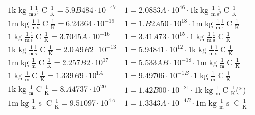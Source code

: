 \begin{center}
\begin{longtable}{l l}
{\color{gray}$1 \bm{\mathrm{ k}}\operatorname{kg}\frac1{\operatorname{m}}\frac1{\operatorname{s}^2}{\operatorname{C}}\frac1{\operatorname{K}} = 5.9B484\cdot10^{-47} $}   & {\color{gray}$ 1 = 2.0853A\cdot10^{46} \cdot 1 \bm{\mathrm{ k}}\operatorname{kg}\frac1{\operatorname{m}}\frac1{\operatorname{s}^2}{\operatorname{C}}\frac1{\operatorname{K}}$}  \\
{\color{gray}$1 \bm{\mathrm{ m}}\operatorname{kg}\frac1{\operatorname{m}}\frac1{\operatorname{s}}{\operatorname{C}}\frac1{\operatorname{K}} = 6.24364\cdot10^{-19} $}   & {\color{gray}$ 1 = 1.B2A50\cdot10^{18} \cdot 1 \bm{\mathrm{ m}}\operatorname{kg}\frac1{\operatorname{m}}\frac1{\operatorname{s}}{\operatorname{C}}\frac1{\operatorname{K}}$}  \\
{\color{black}$1 \bm{\mathrm{ }}\operatorname{kg}\frac1{\operatorname{m}}\frac1{\operatorname{s}}{\operatorname{C}}\frac1{\operatorname{K}} = 3.7045A\cdot10^{-16} $}   & {\color{black}$ 1 = 3.41A73\cdot10^{15} \cdot 1 \bm{\mathrm{ }}\operatorname{kg}\frac1{\operatorname{m}}\frac1{\operatorname{s}}{\operatorname{C}}\frac1{\operatorname{K}}$}  \\
{\color{gray}$1 \bm{\mathrm{ k}}\operatorname{kg}\frac1{\operatorname{m}}\frac1{\operatorname{s}}{\operatorname{C}}\frac1{\operatorname{K}} = 2.0A9B2\cdot10^{-13} $}   & {\color{gray}$ 1 = 5.94841\cdot10^{12} \cdot 1 \bm{\mathrm{ k}}\operatorname{kg}\frac1{\operatorname{m}}\frac1{\operatorname{s}}{\operatorname{C}}\frac1{\operatorname{K}}$}  \\
{\color{gray}$1 \bm{\mathrm{ m}}\operatorname{kg}\frac1{\operatorname{m}}{}{\operatorname{C}}\frac1{\operatorname{K}} = 2.257B2\cdot10^{17} $}   & {\color{gray}$ 1 = 5.533AB\cdot10^{-18} \cdot 1 \bm{\mathrm{ m}}\operatorname{kg}\frac1{\operatorname{m}}{}{\operatorname{C}}\frac1{\operatorname{K}}$}  \\
{\color{black}$1 \bm{\mathrm{ }}\operatorname{kg}\frac1{\operatorname{m}}{}{\operatorname{C}}\frac1{\operatorname{K}} = 1.339B9\cdot10^{1A} $}   & {\color{black}$ 1 = 9.49706\cdot10^{-1B} \cdot 1 \bm{\mathrm{ }}\operatorname{kg}\frac1{\operatorname{m}}{}{\operatorname{C}}\frac1{\operatorname{K}}$}  \\
{\color{gray}$1 \bm{\mathrm{ k}}\operatorname{kg}\frac1{\operatorname{m}}{}{\operatorname{C}}\frac1{\operatorname{K}} = 8.A4737\cdot10^{20} $}   & {\color{gray}$ 1 = 1.42B00\cdot10^{-21} \cdot 1 \bm{\mathrm{ k}}\operatorname{kg}\frac1{\operatorname{m}}{}{\operatorname{C}}\frac1{\operatorname{K}}$}\quad(*)\\
{\color{gray}$1 \bm{\mathrm{ m}}\operatorname{kg}\frac1{\operatorname{m}}{\operatorname{s}}{\operatorname{C}}\frac1{\operatorname{K}} = 9.51097\cdot10^{4A} $}   & {\color{gray}$ 1 = 1.3343A\cdot10^{-4B} \cdot 1 \bm{\mathrm{ m}}\operatorname{kg}\frac1{\operatorname{m}}{\operatorname{s}}{\operatorname{C}}\frac1{\operatorname{K}}$}  \\

\end{longtable}
\end{center}
